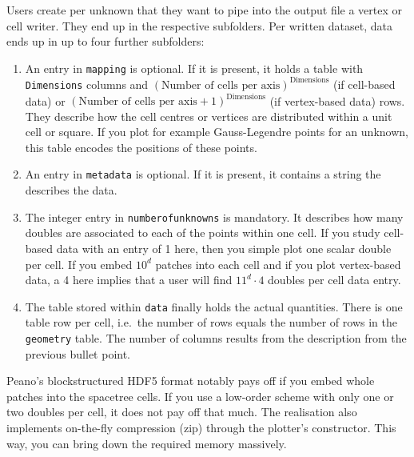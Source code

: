 \noindent
Users create per unknown that they want to pipe into the output file a vertex or
cell writer. 
They end up in the respective subfolders.
Per written dataset, data ends up in up to four further subfolders:
\begin{enumerate}
  \item An entry in \texttt{mapping} is optional. If it is present, it holds a
  table with \texttt{Dimensions} columns and $(\mbox{Number of
  cells per axis})^{\mbox{Dimensions}}$ (if cell-based data) or  $(\mbox{Number
  of cells per axis}+1)^{\mbox{Dimensions}}$ (if vertex-based data) rows.
  They describe how the cell centres or vertices are distributed within a unit
  cell or square. If you plot for example Gauss-Legendre points for an unknown,
  this table encodes the positions of these points.
  \item An entry in \texttt{metadata} is optional. If it is present, it contains
  a string the describes the data.
  \item The integer entry in \texttt{numberofunknowns} is mandatory. It
  describes how many doubles are associated to each of the points within one
  cell. If you study cell-based data with an entry of 1 here, then you simple
  plot one scalar double per cell. If you embed $10^d$ patches into each cell
  and if you plot vertex-based data, a 4 here implies that a user will find
  $11^d \cdot 4$ doubles per cell data entry.
  \item The table stored within \texttt{data} finally holds the actual
  quantities. There is one table row per cell, i.e.~the number of rows equals
  the number of rows in the \texttt{geometry} table. The number of columns
  results from the description from the previous bullet point.
\end{enumerate}


\begin{remark}
 Peano's blockstructured HDF5 format notably pays off if you embed whole patches
 into the spacetree cells. If you use a low-order scheme with only one or two
 doubles per cell, it does not pay off that much. The realisation also
 implements on-the-fly compression (zip) through the plotter's constructor. This
 way, you can bring down the required memory massively. 
\end{remark}
